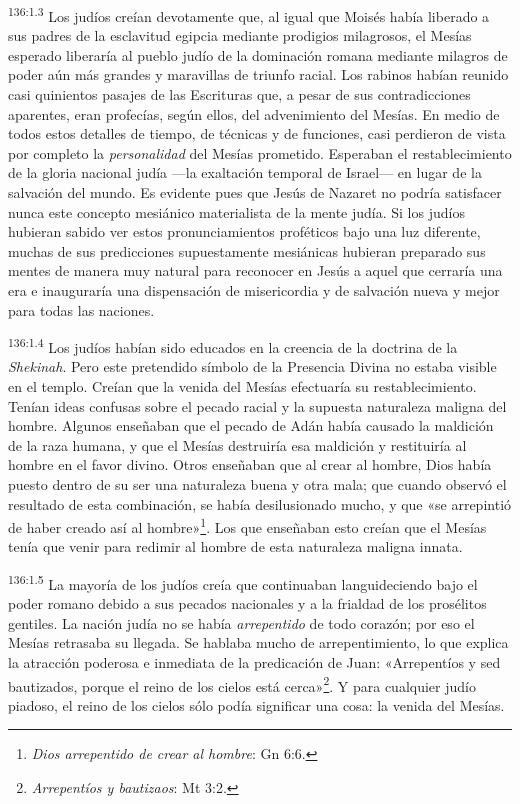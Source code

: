 \par
\textsuperscript{136:1.3} Los judíos creían devotamente que, al igual que Moisés había liberado a sus padres de la esclavitud egipcia mediante prodigios milagrosos, el Mesías esperado liberaría al pueblo judío de la dominación romana mediante milagros de poder aún más grandes y maravillas de triunfo racial. Los rabinos habían reunido casi quinientos pasajes de las Escrituras que, a pesar de sus contradicciones aparentes, eran profecías, según ellos, del advenimiento del Mesías. En medio de todos estos detalles de tiempo, de técnicas y de funciones, casi perdieron de vista por completo la \textit{personalidad} del Mesías prometido. Esperaban el restablecimiento de la gloria nacional judía ---la exaltación temporal de Israel--- en lugar de la salvación del mundo. Es evidente pues que Jesús de Nazaret no podría satisfacer nunca este concepto mesiánico materialista de la mente judía. Si los judíos hubieran sabido ver estos pronunciamientos proféticos bajo una luz diferente, muchas de sus predicciones supuestamente mesiánicas hubieran preparado sus mentes de manera muy natural para reconocer en Jesús a aquel que cerraría una era e inauguraría una dispensación de misericordia y de salvación nueva y mejor para todas las naciones.

\par
\textsuperscript{136:1.4} Los judíos habían sido educados en la creencia de la doctrina de la \textit{Shekinah}. Pero este pretendido símbolo de la Presencia Divina no estaba visible en el templo. Creían que la venida del Mesías efectuaría su restablecimiento. Tenían ideas confusas sobre el pecado racial y la supuesta naturaleza maligna del hombre. Algunos enseñaban que el pecado de Adán había causado la maldición de la raza humana, y que el Mesías destruiría esa maldición y restituiría al hombre en el favor divino. Otros enseñaban que al crear al hombre, Dios había puesto dentro de su ser una naturaleza buena y otra mala; que cuando observó el resultado de esta combinación, se había desilusionado mucho, y que «se arrepintió de haber creado así al hombre»\footnote{\textit{Dios arrepentido de crear al hombre}: Gn 6:6.}. Los que enseñaban esto creían que el Mesías tenía que venir para redimir al hombre de esta naturaleza maligna innata.

\par
\textsuperscript{136:1.5} La mayoría de los judíos creía que continuaban languideciendo bajo el poder romano debido a sus pecados nacionales y a la frialdad de los prosélitos gentiles. La nación judía no se había \textit{arrepentido} de todo corazón; por eso el Mesías retrasaba su llegada. Se hablaba mucho de arrepentimiento, lo que explica la atracción poderosa e inmediata de la predicación de Juan: «Arrepentíos y sed bautizados, porque el reino de los cielos está cerca»\footnote{\textit{Arrepentíos y bautizaos}: Mt 3:2.}. Y para cualquier judío piadoso, el reino de los cielos sólo podía significar una cosa: la venida del Mesías.

